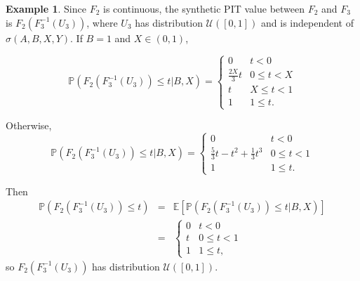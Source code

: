 \documentclass[aap]{imsart}
\theoremstyle{plain}
\theoremstyle{definition}
\newtheorem{example}[theorem]{Example}
\begin{document}
\begin{example}
Since $F_2$ is continuous, the synthetic PIT value between $F_2$ and $F_3$ is $F_2(F_3^{-1}(U_3))$, where $U_3$ has distribution $\mathcal{U}([0,1])$ and is independent of $\sigma(A, B, X, Y)$. If $B = 1$ and $X \in (0,1)$,

\begin{equation*}
  \mathbb{P}(F_2(F_3^{-1}(U_3)) \leq t|B, X) = \begin{cases}
    0             & t < 0 \\
    \frac{2X}{3}t & 0 \leq t < X \\
    t             & X \leq t < 1 \\
    1             & 1 \leq t.
  \end{cases}
\end{equation*}

Otherwise,
\begin{equation*}
  \mathbb{P}(F_2(F_3^{-1}(U_3)) \leq t|B, X) = \begin{cases}
    0                                   & t < 0 \\
    \frac{5}{3}t - t^2 + \frac{1}{3}t^3 & 0 \leq t < 1 \\
    1                                   & 1 \leq t.
  \end{cases}
\end{equation*}

Then
\begin{eqnarray*}
  \mathbb{P}(F_2(F_3^{-1}(U_3)) \leq t) & = & \mathbb{E}[\mathbb{P}(F_2(F_3^{-1}(U_3)) \leq t|B, X)] \\
                                        & = & \begin{cases}
                                                0 & t < 0 \\
                                                t & 0 \leq t < 1 \\
                                                1 & 1 \leq t,
                                              \end{cases}
\end{eqnarray*}
so $F_2(F_3^{-1}(U_3))$ has distribution $\mathcal{U}([0,1])$.


\end{example}
\end{document}
